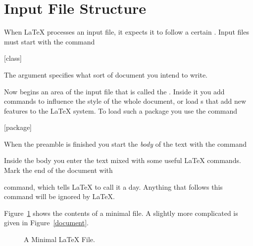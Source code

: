 \section{Input File Structure}\label{sec:structure}
When \LaTeX{} processes an input file, it expects it to follow a
certain . Input files must start with the
command
\begin{code}
  [class]
\end{code}
The  argument specifies what sort of document you intend to write.

Now begins an area of the input file that is called the \emph{}.
Inside it you add commands to influence the style of the whole document, or
load s that add new features to the \LaTeX{} system. To load such a
package you use the command
\begin{code}
  [package]
\end{code}

When the preamble is finished you start the \emph{body} of the text with the
command
\begin{code}
\verb||
\end{code}

Inside the body you enter the text mixed with some useful \LaTeX{} commands.
Mark the end of the document with
\begin{code}
\verb||
\end{code}
command, which tells \LaTeX{} to call it a day. Anything that
follows this command will be ignored by \LaTeX.

Figure~\ref{mini} shows the contents of a minimal \LaTeXe{} file. A
slightly more complicated  is given in
Figure~\ref{document}.

\begin{figure}[htp]
  \begin{lined}{10cm}
  \end{lined}
  \caption{A Minimal \LaTeX{} File.}\label{mini}
\end{figure}

